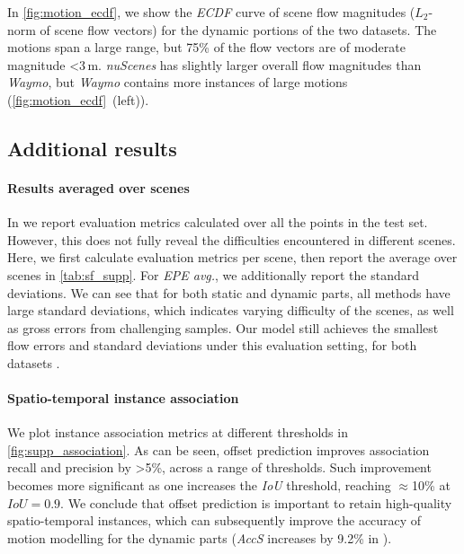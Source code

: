 In \cref{fig:motion_ecdf}, we show the \textit{ECDF} curve of scene flow magnitudes ($L_2$-norm of scene flow vectors) for the dynamic portions of the two datasets. The motions span a large range, but 75\% of the flow vectors are of moderate magnitude \textless3$\,$m. \emph{nuScenes} has slightly larger overall flow magnitudes than \emph{Waymo}, but \emph{Waymo} contains more instances of large motions (\cref{fig:motion_ecdf}~(left)).

\subsection{Additional results}
\label{sec:supp_quan}
\paragraph{Results averaged over scenes}

In  we report evaluation metrics calculated over all the points in the test set. However, this does not fully reveal the difficulties encountered in different scenes. Here, we first calculate evaluation metrics per scene, then report the average over scenes in \cref{tab:sf_supp}. For \textit{EPE avg.}, we additionally report the standard deviations. We can see that for both static and dynamic parts, all methods have large standard deviations, which indicates varying difficulty of the scenes, as well as gross errors from challenging samples. Our model still achieves the smallest flow errors and standard deviations under this evaluation setting, for both datasets . 


\paragraph{Spatio-temporal instance association}

We plot instance association metrics at different thresholds in \cref{fig:supp_association}. As can be seen, offset prediction improves association recall and precision by \textgreater5\%, across a range of thresholds. Such improvement becomes more significant as one increases the \textit{IoU} threshold, reaching $\approx$10\% at $IoU=0.9$. We conclude that offset prediction is important to retain high-quality spatio-temporal instances, which can subsequently improve the accuracy of motion modelling for the dynamic parts (\textit{AccS} increases by 9.2\%  in ).


